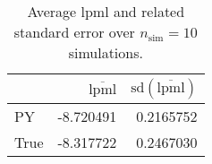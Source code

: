 \begin{table}[H]

\caption{Average lpml and related standard error over $n_{\text{sim}} = 10$ simulations.}
\centering
\begin{tabular}[t]{lrr}
\toprule
  & $\overbar{\text{lpml}}$ & $\text{sd}(\overbar{\text{lpml}})$\\
\midrule
PY & -8.720491 & 0.2165752\\
True & -8.317722 & 0.2467030\\
\bottomrule
\end{tabular}
\end{table}